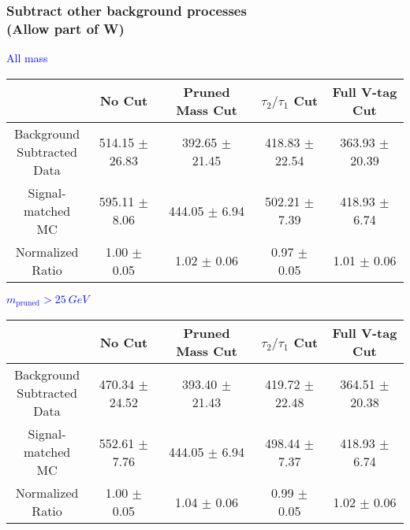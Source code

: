 \documentclass{beamer}
\begin{document}
\begin{frame}
  \frametitle{Subtract other background processes \\ (Allow part of W)}
  \begin{adjustwidth}{-1.5em}{-1.5em}
    \centering
    \vspace{6pt}
    \textcolor{blue}{All mass}
    \vspace{6pt}

    {\scriptsize
      \begin{tabular}{c | c | c | c | c}
        \hline
        & No Cut & Pruned Mass Cut & $\tau_2/\tau_1$ Cut & Full V-tag Cut \\
        \hline
        \makecell{Background \\ Subtracted \\ Data} & 514.15 $\pm$ 26.83 & 392.65 $\pm$ 21.45 & 418.83 $\pm$ 22.54 & 363.93 $\pm$ 20.39 \\
        \makecell{Signal-\\ matched MC} & 595.11 $\pm$ 8.06 & 444.05 $\pm$ 6.94 & 502.21 $\pm$ 7.39 & 418.93 $\pm$ 6.74 \\
        \hline
        \makecell{Normalized \\ Ratio} & 1.00 $\pm$ 0.05 & 1.02 $\pm$ 0.06 & 0.97 $\pm$ 0.05 & 1.01 $\pm$ 0.06 \\
        \hline
      \end{tabular}
    }

    \vspace{6pt}
    \textcolor{blue}{$m_\text{pruned} > \SI{25}{GeV}$}
    \vspace{6pt}

    {\scriptsize
      \begin{tabular}{c | c | c | c | c}
        \hline
        & No Cut & Pruned Mass Cut & $\tau_2/\tau_1$ Cut & Full V-tag Cut \\
        \hline
        \makecell{Background \\ Subtracted \\ Data} & 470.34 $\pm$ 24.52 & 393.40 $\pm$ 21.43 & 419.72 $\pm$ 22.48 & 364.51 $\pm$ 20.38 \\
        \makecell{Signal-\\ matched MC} & 552.61 $\pm$ 7.76 & 444.05 $\pm$ 6.94 & 498.44 $\pm$ 7.37 & 418.93 $\pm$ 6.74 \\
        \hline
        \makecell{Normalized \\ Ratio} & 1.00 $\pm$ 0.05 & 1.04 $\pm$ 0.06 & 0.99 $\pm$ 0.05 & 1.02 $\pm$ 0.06 \\
        \hline
      \end{tabular}
    }
  \end{adjustwidth}
\end{frame}
\end{document}
